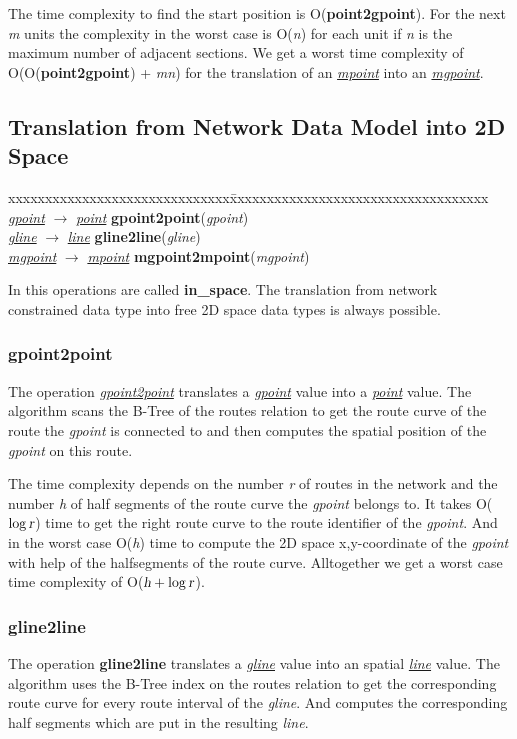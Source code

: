 \documentclass[a4paper]{article}
\newcommand{\op}[1]{\textbf{#1}}
\newcommand{\var}[1]{\textsl{#1}}
\newcommand{\dt}[1]{\textsl{\underline{#1}}}
\begin{document}
The time complexity to find the start position is O(\op{point2gpoint}). For the next \var{m} units the complexity in the worst case is O(\var{n}) for each unit if \var{n} is the maximum number of adjacent sections. We get a worst time complexity of O(O(\op{point2gpoint}) + \var{mn}) for the translation of an \dt{mpoint} into an \dt{mgpoint}.
\subsection{Translation from Network Data Model into 2D Space}
\label{sec:translops}
\begin{tabbing}
xxxxxxxxxxxxxxxxxxxxxxxxxxxxxx\=xxxxxxxxxxxxxxxxxxxxxxxxxxxxxxxxxxx\kill
\dt{gpoint} $\rightarrow$ \dt{point} \> \op{gpoint2point}(\var{gpoint}) \\
\dt{gline} $\rightarrow$ \dt{line} \> \op{gline2line}(\var{gline}) \\
\dt{mgpoint} $\rightarrow$ \dt{mpoint} \> \op{mgpoint2mpoint}(\var{mgpoint})\\
\end{tabbing}
In \cite{1146465} this operations are called \op{in\_space}. The translation from network constrained data type into free 2D space data types is always possible.
\subsubsection{\op{gpoint2point}}
The operation \dt{gpoint2point} translates a \dt{gpoint} value into a \dt{point} value. 
The algorithm scans the B-Tree of the routes relation to get the route curve of the route the \var{gpoint} is connected to and then computes the spatial position of the \var{gpoint} on this route.

The time complexity depends on the number \var{r} of routes in the network and the number \var{h} of half segments of the route curve the \var{gpoint} belongs to. It takes O($\log \var{r}$) time to get the right route curve to the route identifier of the \var{gpoint}. And in the worst case O(\var{h}) time to compute the 2D space x,y-coordinate of the \var{gpoint} with help of the halfsegments of the route curve. Alltogether we get a worst case time complexity of O($\var{h} + \log \var{r}$).
\subsubsection{\op{gline2line}}
The operation \op{gline2line} translates a \dt{gline} value into an spatial \dt{line} value. The algorithm uses the B-Tree index on the routes relation to get the corresponding route curve for every route interval of the \var{gline}. And computes the corresponding half segments which are put in the resulting \var{line}.
\end{document}
